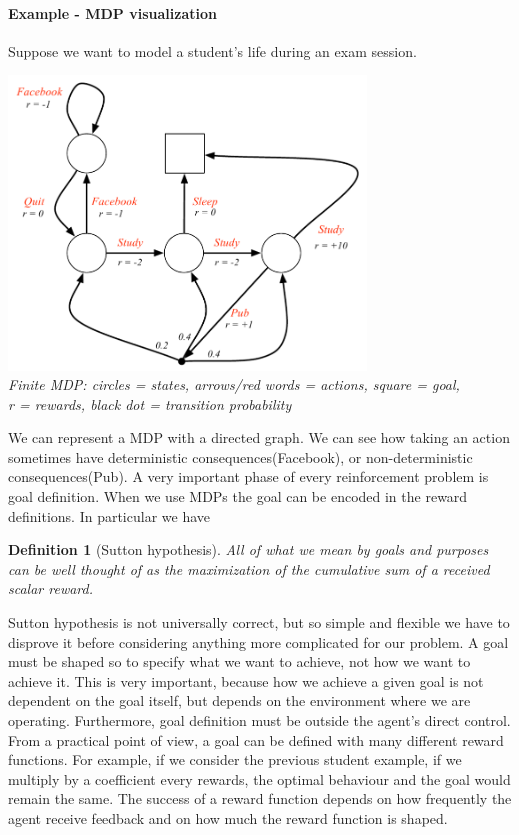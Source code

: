 \documentclass[main.tex]{subfiles}
\newtheorem{definition}{Definition}[section]
\begin{document}
\paragraph{Example - MDP visualization} Suppose we want to model a student's life during an exam session.
\begin{center}
    \includegraphics[width=95mm]{img/MDP.PNG}\\
    \textit{Finite MDP: circles = states, arrows/red words = actions, square = goal,}\\
    \textit{r = rewards, black dot = transition probability}
\end{center}
We can represent a MDP with a directed graph. We can see how taking an action sometimes have deterministic consequences(Facebook), or non-deterministic consequences(Pub).
\newline
\newline
A very important phase of every reinforcement problem is goal definition. When we use MDPs the goal can be encoded in the reward definitions. In particular we have
\begin{definition}[Sutton hypothesis]
All of what we mean by goals and purposes can be well thought of as the maximization of the cumulative sum of a received scalar reward.
\end{definition} 
Sutton hypothesis is not universally correct, but so simple and flexible we have to disprove it before considering anything more complicated for our problem.
A goal must be shaped so to specify what we want to achieve, not how we want to
achieve it. This is very important, because how we achieve a given goal is not dependent on the goal itself, but depends on the environment where we are operating. Furthermore, goal definition must be outside the agent’s direct control. From a practical point of view, a goal can be defined with many different reward functions. For example, if we consider the previous student example, if we multiply by a coefficient every rewards, the optimal behaviour and the goal would remain the same. The success of a reward function depends on how frequently the agent receive feedback and on how much the reward function is shaped\footnotemark. 
\end{document}
